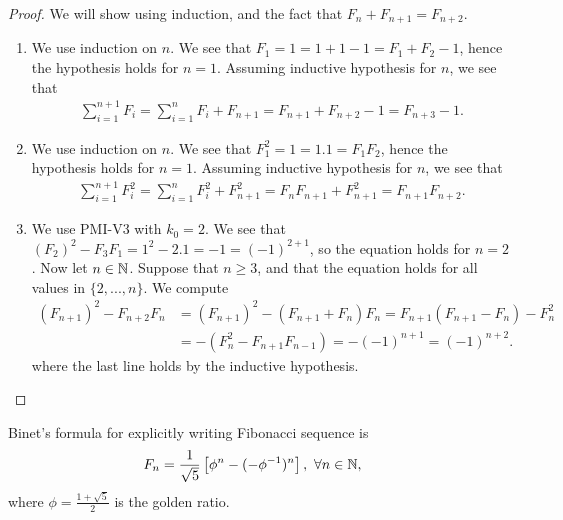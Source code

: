 \documentclass[a4paper,english,12pt]{article}
\begin{document}
\begin{proof} We will show using induction, and the fact that $F_{n} + F_{n+1} = F_{n+2}$. 
\begin{enumerate}
	\item We use induction on $n$. We see that $F_1 = 1 = 1 + 1 - 1 = F_1+F_2-1$, hence the hypothesis holds for $n=1$. Assuming inductive hypothesis for $n$, we see that 
	\begin{align*}
	\sum_{i=1}^{n+1}F_i = \sum_{i=1}^{n}F_i + F_{n+1} = F_{n+1} + F_{n+2} - 1 = F_{n+3} - 1.
	\end{align*}
	\item We use induction on $n$. We see that $F_1^2 = 1 = 1 .1 = F_1F_2$, hence the hypothesis holds for $n=1$. Assuming inductive hypothesis for $n$, we see that 
	\begin{align*}
	\sum_{i=1}^{n+1}F_i^2 = \sum_{i=1}^{n}F_i^2 + F_{n+1}^2 = F_nF_{n+1} + F_{n+1}^2 = F_{n+1
	}F_{n+2}.
	\end{align*}
	\item We use PMI-V3 with $k_0 = 2$. We see that $(F_2)^2-F_3F_1=1^2-2.1=-1=(-1)^{2+1}$, so the equation holds for $n=2$. Now let $n \in \mathbb{N}$. Suppose that $n \geq 3$, and that the equation holds for all values in $\{2, . . ., n\}$. We compute 
\begin{align*}
(F_{n+1})^2 - F_{n+2}F_n&=(F_{n+1})^2 - (F_{n+1}+F_n)F_n = F_{n+1}(F_{n+1}-F_n) - F_n^2\\
&= -(F_{n}^2-F_{n+1}F_{n-1}) = - (-1)^{n+1} = (-1)^{n+2}.
\end{align*} 
where the last line holds by the inductive hypothesis.
\end{enumerate}
\end{proof}
\begin{rem} Binet's formula for explicitly writing Fibonacci sequence is 
\begin{align*}
F_n %
&=\frac{1}{\sqrt{5}}\left[\phi^n - (-\phi^{-1})^n \right], ~\forall n \in \N,
\end{align*}
where $\phi = \frac{1 + \sqrt{5}}{2}$ is the golden ratio.
\end{rem}
\end{document}
